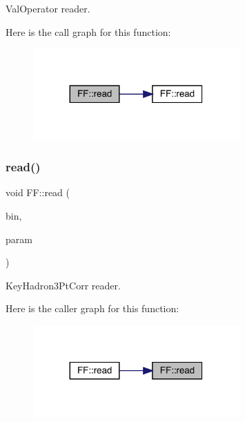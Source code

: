 Val\+Operator reader. 

Here is the call graph for this function\+:\nopagebreak
\begin{figure}[H]
\begin{center}
\leavevmode
\includegraphics[width=224pt]{d5/da6/namespaceFF_adbbf0211a7578841555412497b4f18c4_cgraph}
\end{center}
\end{figure}
\mbox{\label{namespaceFF_a257b587cc1107da7cde8c3d17ea5ce50}} 
\subsubsection{\texorpdfstring{read()}{read()}\hspace{0.1cm}{\footnotesize\ttfamily [15/15]}}
{\footnotesize\ttfamily void F\+F\+::read (\begin{DoxyParamCaption}\item[{\mbox{\hyperlink{classADATIO_1_1BinaryReader}{Binary\+Reader}} \&}]{bin,  }\item[{\mbox{\hyperlink{structFF_1_1KeyHadron3PtCorr__t}{Key\+Hadron3\+Pt\+Corr\+\_\+t}} \&}]{param }\end{DoxyParamCaption})}



Key\+Hadron3\+Pt\+Corr reader. 

Here is the caller graph for this function\+:
\nopagebreak
\begin{figure}[H]
\begin{center}
\leavevmode
\includegraphics[width=224pt]{d5/da6/namespaceFF_a257b587cc1107da7cde8c3d17ea5ce50_icgraph}
\end{center}
\end{figure}
\mbox{\label{namespaceFF_a831b58b450a964b114e0fce65fc4de99}} 
